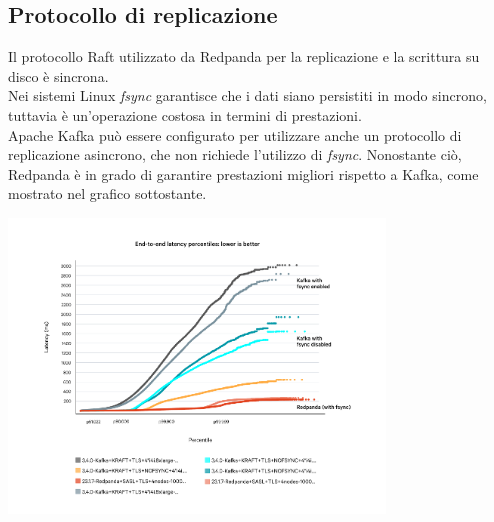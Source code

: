 \subsection{Protocollo di replicazione}
Il protocollo Raft utilizzato da Redpanda per la replicazione e la scrittura su disco è sincrona. \\
Nei sistemi Linux \textit{fsync} garantisce che i dati siano persistiti in modo sincrono, tuttavia
è un'operazione costosa in termini di prestazioni.\\
Apache Kafka può essere configurato per utilizzare anche un protocollo di replicazione asincrono, che non richiede l'utilizzo di \textit{fsync}.
Nonostante ciò, Redpanda è in grado di garantire prestazioni migliori rispetto a Kafka, come mostrato nel grafico sottostante.

\begin{center}
	\includegraphics[width=0.75\textwidth]{imgs/fsync.png}
\end{center}



























